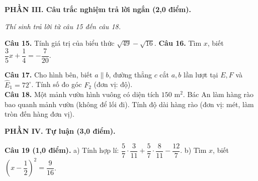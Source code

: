 \documentclass[10.5pt,a4paper]{article}
\begin{document}
\vspace{1.5mm}
\noindent\textbf{\large PHẦN III. Câu trắc nghiệm trả lời ngắn (2,0 điểm).}
\vspace{0.5mm}

\noindent\textit{Thí sinh trả lời từ câu 15 đến câu 18.}

\vspace{1mm}
\noindent\textbf{Câu 15.} Tính giá trị của biểu thức $\sqrt{49} - \sqrt{16}$.\hfill
\textbf{Câu 16.} Tìm $x$, biết $\dfrac{3}{5}x + \dfrac{1}{4} = -\dfrac{7}{20}$.

\vspace{1mm}
\noindent
\begin{minipage}[m]{0.65\linewidth}
\textbf{Câu 17.} Cho hình bên, biết $a \parallel b$, đường thẳng $c$ cắt $a, b$ lần lượt tại $E, F$ và $\widehat{E}_1 = 72^\circ$. Tính số đo góc $F_2$ (đơn vị: độ).\\
\textbf{Câu 18.} Một mảnh vườn hình vuông có diện tích $150\text{ m}^2$. Bác An làm hàng rào bao quanh mảnh vườn (không để lối đi). Tính độ dài hàng rào (đơn vị: mét, làm tròn đến hàng đơn vị).
\end{minipage}
\hfill
\begin{minipage}[m]{0.33\linewidth}
\centering
{}
\end{minipage}

\vspace{1.5mm}
\noindent\textbf{\large PHẦN IV. Tự luận (3,0 điểm).}
\vspace{1mm}

\noindent\textbf{Câu 19 (1,0 điểm).} a) Tính hợp lí: $\dfrac{5}{7} \cdot \dfrac{3}{11} + \dfrac{5}{7} \cdot \dfrac{8}{11} - \dfrac{12}{7}$. \quad b) Tìm $x$, biết $\left(x - \dfrac{1}{2}\right)^2 = \dfrac{9}{16}$.
\end{document}
